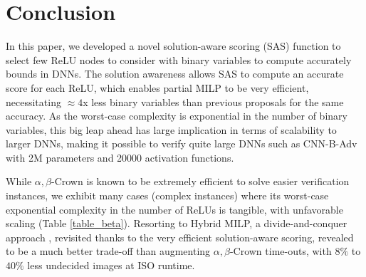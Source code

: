 \documentclass{llncs}
\newcommand{\ReLU}{\mathrm{ReLU}}
\begin{document}
\iffalse
In some cases, the output is a vector but the aim to get the label of dimension with the minimal value. In this case, the problem can be written as:\begin{align*}
	\forall \boldsymbol{x} \in\mathcal{D} \  \min f(\boldsymbol{x}) = \min f(\boldsymbol{x}_0)
\end{align*}

If so, the question of verification can turn to the following optimization question: \begin{align*}
	\min f(\boldsymbol{x}) \ s.t. {\boldsymbol{z}}^{i} &= \boldsymbol{W}^i\cdot \hat{\boldsymbol{z}}^{(i-1)}+ b^i\\
	\hat{\boldsymbol{z}}^{i}(n) &= \sigma({\boldsymbol{z}}^i(n)), \boldsymbol{x}\in\mathcal{D}.
\end{align*}

In this paper, we only consider $\ReLU$ function as the activation function: $\sigma(a)=\ReLU(a)=\max(0,a)$. 

In this paper, we consider $L^{\infty}$ norm the max value of distance of each dimension, that is $d(\vx,\boldsymbol{x}_0)=\max |\boldsymbol{x}(n)-\boldsymbol{x}_0(n)|$. 
\fi


 














\section{Conclusion}
In this paper, we developed a novel solution-aware scoring (SAS) function to select few ReLU nodes to consider with binary variables to compute accurately bounds in DNNs. 
The solution awareness allows SAS to compute an accurate score for each ReLU, which enables partial MILP to be very efficient, necessitating $\approx4$x less binary variables than previous proposals \cite{DivideAndSlide} for the same accuracy. As the worst-case complexity is exponential in the number of binary variables, this big leap ahead has large implication in terms of scalability to larger DNNs, making it possible to verify quite large DNNs such as CNN-B-Adv with 2M parameters and 20000 activation functions. 

While $\alpha,\beta$-Crown is known to be extremely efficient to solve easier verification instances, we exhibit many cases (complex instances) where its worst-case exponential complexity in the number of ReLUs is tangible, with unfavorable scaling (Table \ref{table_beta}). Resorting to Hybrid MILP, a divide-and-conquer approach \cite{DivideAndSlide}, revisited thanks to the very efficient solution-aware scoring, revealed to be a much better trade-off than augmenting $\alpha,\beta$-Crown time-outs, with $8\%$ to $40\%$ less undecided images at ISO runtime.
\end{document}
